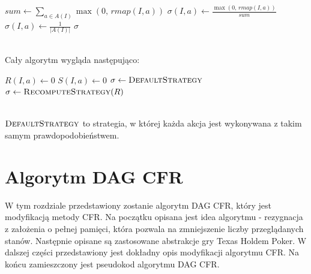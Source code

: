 \documentclass[magisterska]{pracamgr}
\begin{document}
\begin{algorithmic}
            \State $sum \gets \sum\limits_{a \in A(I)} \max(0, \, rmap(I, a))$
                    \State $\sigma(I, a) \gets \frac{\max(0, \, rmap(I, a))}{sum}$
                \EndFor
            \Else
                    \State $\sigma(I, a) \gets \frac{1}{|A(I)|}$
                \EndFor
            \EndIf
        \EndFor
        \State \Return $\sigma$
    \EndFunction
\end{algorithmic}

$\,$ \\
\noindent
Cały algorytm wygląda następująco: \\

\begin{algorithmic}
                \State $R(I, a) \gets 0$
                \State $S(I, a) \gets 0$
            \EndFor
        \EndFor
        \State $\sigma \gets \Call{DefaultStrategy}{}$
            \State {}
            \State $\sigma \gets \Call{RecomputeStrategy}{R}$
        \EndFor
        \State \Return {}
    \EndFunction
\end{algorithmic}

$\,$ \\
\noindent
$\Call{DefaultStrategy}{}$ to strategia, w której każda akcja jest wykonywana z takim samym prawdopodobieństwem.

\chapter{Algorytm DAG CFR}

\noindent
W tym rozdziale przedstawiony zostanie algorytm DAG CFR, który jest modyfikacją metody CFR. Na początku
opisana jest idea algorytmu - rezygnacja z założenia o pełnej pamięci, która pozwala na zmniejszenie liczby
przeglądanych stanów. Następnie opisane są zastosowane abstrakcje gry Texas Holdem Poker. W dalszej części
przedstawiony jest dokładny opis modyfikacji algorytmu CFR. Na końcu zamieszczony jest pseudokod algorytmu
DAG CFR. \\ 
\end{document}
